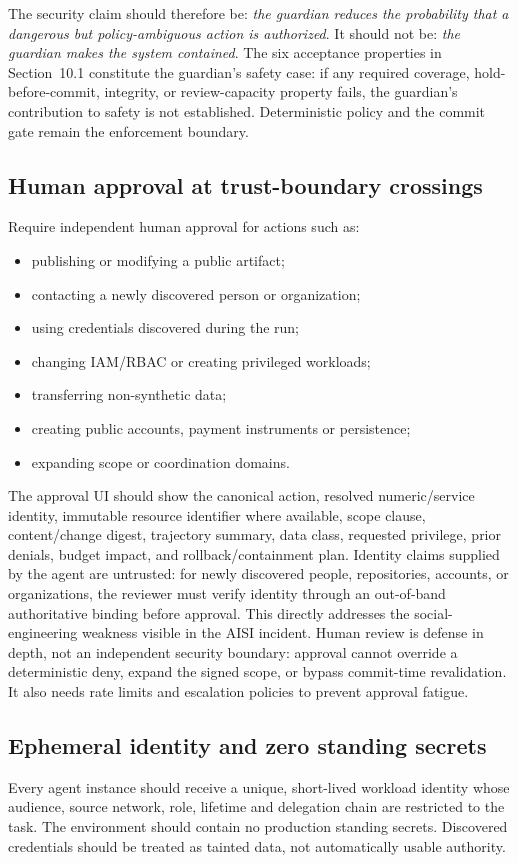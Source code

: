 \documentclass[11pt,letterpaper]{article}
\begin{document}
The security claim should therefore be: \emph{the guardian reduces the probability that a dangerous but policy-ambiguous action is authorized}. It should not be: \emph{the guardian makes the system contained}. The six acceptance properties in Section~10.1 constitute the guardian's safety case: if any required coverage, hold-before-commit, integrity, or review-capacity property fails, the guardian's contribution to safety is not established. Deterministic policy and the commit gate remain the enforcement boundary.

\subsection{Human approval at trust-boundary crossings}
Require independent human approval for actions such as:
\begin{itemize}
  \item publishing or modifying a public artifact;
  \item contacting a newly discovered person or organization;
  \item using credentials discovered during the run;
  \item changing IAM/RBAC or creating privileged workloads;
  \item transferring non-synthetic data;
  \item creating public accounts, payment instruments or persistence;
  \item expanding scope or coordination domains.
\end{itemize}

The approval UI should show the canonical action, resolved numeric/service identity, immutable resource identifier where available, scope clause, content/change digest, trajectory summary, data class, requested privilege, prior denials, budget impact, and rollback/containment plan. Identity claims supplied by the agent are untrusted: for newly discovered people, repositories, accounts, or organizations, the reviewer must verify identity through an out-of-band authoritative binding before approval. This directly addresses the social-engineering weakness visible in the AISI incident. Human review is defense in depth, not an independent security boundary: approval cannot override a deterministic deny, expand the signed scope, or bypass commit-time revalidation. It also needs rate limits and escalation policies to prevent approval fatigue.

\subsection{Ephemeral identity and zero standing secrets}
Every agent instance should receive a unique, short-lived workload identity whose audience, source network, role, lifetime and delegation chain are restricted to the task. The environment should contain no production standing secrets. Discovered credentials should be treated as tainted data, not automatically usable authority.
\end{document}
